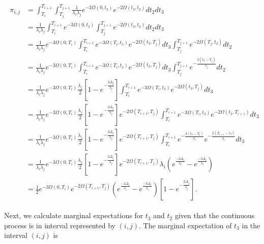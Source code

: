 \documentclass{article}
\begin{document}
\begin{align}
    \begin{split}
        \pi_{i,j} &=
        \int_{T_i}^{T_{i+1}}\int_{T_j}^{T_{j+1}}\frac{1}{\lambda_i\lambda_j}e^{-3\Omega(0,t_3)}e^{-2\Omega(t_3,t_2)}dt_2dt_3\\
        &= \frac{1}{\lambda_i\lambda_j}\int_{T_i}^{T_{i+1}}e^{-3\Omega(0,t_3)}\int_{T_j}^{T_{j+1}}e^{-2\Omega(t_3,t_2)}dt_2dt_3\\
        &= \frac{1}{\lambda_i\lambda_j}e^{-3\Omega(0,T_i)}\int_{T_i}^{T_{i+1}}e^{-3\Omega(T_i,t_3)}e^{-2\Omega(t_3,T_j)}dt_3
            \int_{T_j}^{T_{j+1}}e^{-2\Omega(T_j,t_2)}dt_2\\
        &= \frac{1}{\lambda_i\lambda_j}e^{-3\Omega(0,T_i)}\int_{T_i}^{T_{i+1}}e^{-3\Omega(T_i,t_3)}e^{-2\Omega(t_3,T_j)}dt_3
            \int_{T_j}^{T_{j+1}}e^{-\frac{2(t_2-T_j)}{\lambda_j}}dt_2\\
        &= \frac{1}{\lambda_i\lambda_j}e^{-3\Omega(0,T_i)}\frac{\lambda_j}{2}\left[1-e^{-\frac{2\Delta_j}{\lambda_j}}\right]
            \int_{T_i}^{T_{i+1}}e^{-3\Omega(T_i,t_3)}e^{-2\Omega(t_3,T_j)}dt_3\\
        &= \frac{1}{\lambda_i\lambda_j}e^{-3\Omega(0,T_i)}\frac{\lambda_j}{2}\left[1-e^{-\frac{2\Delta_j}{\lambda_j}}\right]
            e^{-2\Omega(T_{i+1},T_j)}
            \int_{T_i}^{T_{i+1}}e^{-3\Omega(T_i,t_3)}e^{-2\Omega(t_3,T_{i+1})}dt_3\\
        &= \frac{1}{\lambda_i\lambda_j}e^{-3\Omega(0,T_i)}\frac{\lambda_j}{2}\left[1-e^{-\frac{2\Delta_j}{\lambda_j}}\right]
            e^{-2\Omega(T_{i+1},T_j)}
            \int_{T_i}^{T_{i+1}}e^{-\frac{3(t_3-T_i)}{\lambda_i}}e^{-\frac{2(T_{i+1}-t_3)}{\lambda_i}}dt_3\\
        &= \frac{1}{\lambda_i\lambda_j}e^{-3\Omega(0,T_i)}\frac{\lambda_j}{2}\left[1-e^{-\frac{2\Delta_j}{\lambda_j}}\right]
            e^{-2\Omega(T_{i+1},T_j)}
            \lambda_i \left(e^{\frac{-2\Delta_i}{\lambda_i}}-e^{\frac{-3\Delta_i}{\lambda_i}}\right)\\
        &= \frac{1}{2}e^{-3\Omega(0,T_i)}e^{-2\Omega(T_{i+1},T_j)}
            \left(e^{\frac{-2\Delta_i}{\lambda_i}}-e^{\frac{-3\Delta_i}{\lambda_i}}\right)
            \left[1-e^{-\frac{2\Delta_j}{\lambda_j}}\right].
    \end{split}
    \label{eq:pidiscrete}
\end{align}

Next, we calculate marginal expectations for $t_3$ and $t_2$ given that the
continuous process is in interval represented by $(i,j)$. The marginal
expectation of $t_3$ in the interval $(i,j)$ is 
\end{document}
